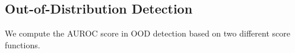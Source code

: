 \documentclass[tablecaption=bottom,wcp]{jmlr} %
\begin{document}
\newpage
\subsection{Out-of-Distribution Detection}
\label{appendix-sec:ood-detection}
We compute the AUROC score in OOD detection based on two different score functions.



\end{document}
